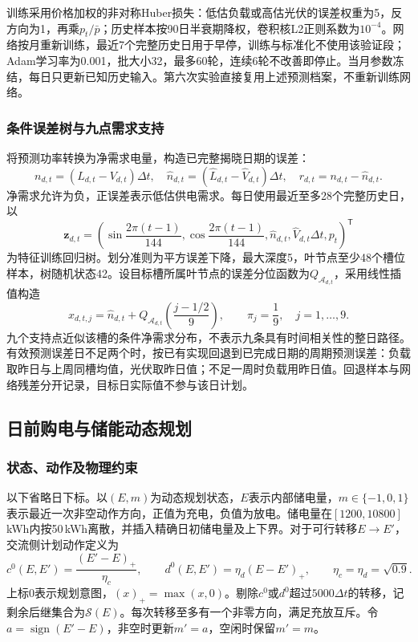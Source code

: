 训练采用价格加权的非对称Huber损失：低估负载或高估光伏的误差权重为5，反方向为1，再乘$p_t/\bar p$；历史样本按90日半衰期降权，卷积核L2正则系数为$10^{-4}$。网络按月重新训练，最近7个完整历史日用于早停，训练与标准化不使用该验证段；Adam学习率为0.001，批大小32，最多60轮，连续6轮不改善即停止。当月参数冻结，每日只更新已知历史输入。第六次实验直接复用上述预测档案，不重新训练网络。

\subsubsection{条件误差树与九点需求支持}

将预测功率转换为净需求电量，构造已完整揭晓日期的误差：
\begin{equation}\label{eq:q2-error}
 n_{d,t}=(L_{d,t}-V_{d,t})\Delta t,\quad
 \widehat n_{d,t}=(\widehat L_{d,t}-\widehat V_{d,t})\Delta t,\quad
 r_{d,t}=n_{d,t}-\widehat n_{d,t}.
\end{equation}
净需求允许为负，正误差表示低估供电需求。每日使用最近至多28个完整历史日，以
\begin{equation}\label{eq:q2-feature}
 \mathbf z_{d,t}=\left(\sin\frac{2\pi(t-1)}{144},\cos\frac{2\pi(t-1)}{144},
 \widehat n_{d,t},\widehat V_{d,t}\Delta t,p_t\right)^{\mathsf T}
\end{equation}
为特征训练回归树。划分准则为平方误差下降，最大深度5，叶节点至少48个槽位样本，树随机状态42。设目标槽所属叶节点的误差分位函数为$Q_{\mathcal A_{d,t}}$，采用线性插值构造
\begin{equation}\label{eq:q2-support}
 x_{d,t,j}=\widehat n_{d,t}+Q_{\mathcal A_{d,t}}\left(\frac{j-1/2}{9}\right),
 \qquad \pi_j=\frac19,\quad j=1,\ldots,9.
\end{equation}
九个支持点近似该槽的条件净需求分布，不表示九条具有时间相关性的整日路径。有效预测误差日不足两个时，按已有实现回退到已完成日期的周期预测误差：负载取昨日与上周同槽均值，光伏取昨日值；不足一周时负载用昨日值。回退样本与网络残差分开记录，目标日实际值不参与该日计划。

\subsection{日前购电与储能动态规划}
\subsubsection{状态、动作及物理约束}

以下省略日下标。以$(E,m)$为动态规划状态，$E$表示内部储电量，$m\in\{-1,0,1\}$表示最近一次非空动作方向，正值为充电，负值为放电。储电量在$[1200,10800]$\,kWh内按50\,kWh离散，并插入精确日初储电量及上下界。对于可行转移$E\to E'$，交流侧计划动作定义为
\begin{equation}\label{eq:q2-actions}
 c^0(E,E')=\frac{(E'-E)_+}{\eta_c},\qquad
 d^0(E,E')=\eta_d(E-E')_+,\qquad \eta_c=\eta_d=\sqrt{0.9}.
\end{equation}
上标0表示规划意图，$(x)_+=\max(x,0)$。剔除$c^0$或$d^0$超过$5000\Delta t$的转移，记剩余后继集合为$\mathcal S(E)$。每次转移至多有一个非零方向，满足充放互斥。令$a=\operatorname{sign}(E'-E)$，非空时更新$m'=a$，空闲时保留$m'=m$。

